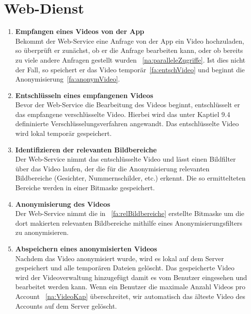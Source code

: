\section{Web-Dienst}
\begin{enumerate}
\renewcommand{\labelenumi}{\textbf{\theenumi}}
\renewcommand{\theenumi}{FA\arabic{enumi}0}
\setcounter{enumi}{199}

\item  \textbf{Empfangen eines Videos von der App} \hfill \\
Bekommt der Web-Service eine Anfrage von der App ein Video hochzuladen, so überprüft er zunächst, ob er die Anfrage bearbeiten kann, oder ob bereits zu viele andere Anfragen gestellt wurden ~\eqref{na:paralleleZugriffe}. Ist dies nicht der Fall, so speichert er das Video temporär~\eqref{fa:entschVideo} und beginnt die Anonymisierung~\eqref{fa:anonymVideo}.

\item  \label{fa:entschVideo}\textbf{Entschlüsseln eines empfangenen Videos} \hfill \\
Bevor der Web-Service die Bearbeitung des Videos beginnt, entschlüsselt er das empfangene verschlüsselte Video. Hierbei wird das unter Kaptiel 9.4 defininierte Verschlüsselungsverfahren angewandt. Das entschlüsselte Video wird lokal temporär gespeichert.

\item  \label{fa:relBildbereiche}\textbf{Identifizieren der relevanten Bildbereiche} \hfill \\
Der Web-Service nimmt das entschlüsselte Video und lässt einen Bildfilter über das Video laufen, der die für die Anonymisierung relevanten Bildbereiche (Gesichter, Nummernschilder, etc.) erkennt. Die so ermittelteten Bereiche werden in einer Bitmaske gespeichert.

\item  \label{fa:anonymVideo}\textbf{Anonymisierung des Videos} \hfill \\
Der Web-Service nimmt die in ~\eqref{fa:relBildbereiche} erstellte Bitmaske um die dort makierten relevanten Bildbereiche mithilfe eines Anonymisierungsfilters zu anonymisieren.

\item \label{fa:speichVideo}\textbf{Abspeichern eines anonymisierten Videos} \hfill \\
Nachdem das Video anonymisiert wurde, wird es lokal auf dem Server gespeichert und alle temporären Dateien gelöscht. Das gespeicherte Video wird der Videoverwaltung hinzugefügt damit es vom Benutzer eingesehen und bearbeitet werden kann. Wenn ein Benutzer die maximale Anzahl Videos pro Account ~\eqref{na:VideoKap} überschreitet, wir automatisch das älteste Video des Accounts auf dem Server gelöscht.
\end{enumerate}

